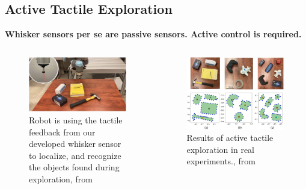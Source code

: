 \subsection{Active Tactile Exploration}
\textbf{Whisker sensors per se are passive sensors. \to Active control is required.}\\
\begin{columns}[T,onlytextwidth]
    \begin{column}[T]{0.48\textwidth}
        \begin{figure}[H]
            \centering
            \includegraphics[width=\textwidth]{figures/related-works-2-prototype}
            \caption{Robot is using the tactile feedback from our developed whisker sensor to localize, and recognize the objects found during exploration, from~\cite{Xiao_2022}}
        \end{figure}
    \end{column}
    \begin{column}[T]{0.48\textwidth}
        \begin{figure}[H]
            \centering
            \includegraphics[width=\textwidth]{figures/related-works-2-results}
            \caption{Results of active tactile exploration in real experiments., from~\cite{Xiao_2022}}
        \end{figure}
    \end{column}
\end{columns}